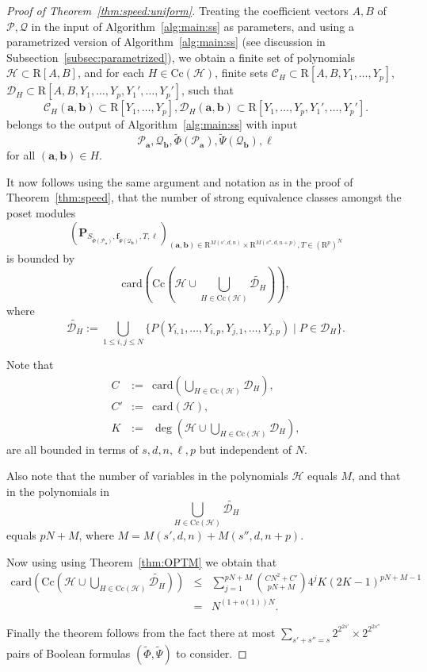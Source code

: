 \documentclass{amsart}[10pts]
\theoremstyle{definition}
\theoremstyle{remark}
\theoremstyle{observation}
\numberwithin{equation}{section}
\newcommand {\R} {\mathrm{R}}
\newcommand{\card}{\mathrm{card}}
\newcommand{\Cc}{\mathrm{Cc}}
\begin{document}
\begin{proof}[Proof of Theorem~\ref{thm:speed:uniform}]
Treating the coefficient vectors $A,B$ of $\mathcal{P},\mathcal{Q}$ in
the input of Algorithm~\ref{alg:main:ss} as parameters, 
and using a parametrized version of  Algorithm~\ref{alg:main:ss} (see discussion in Subsection~\ref{subsec:parametrized}),
we obtain a finite set of polynomials $\mathcal{H} \subset \R[A,B]$, and for each $H \in \Cc(\mathcal{H})$,
finite sets $\mathcal{C}_H \subset \R[A,B,Y_1,\ldots,Y_p]$,
$\mathcal{D}_H \subset \R[A,B,Y_1,\ldots,Y_p,Y_1',\ldots,Y_p']$,
such that
\[
\mathcal{C}_H(\mathbf{a},\mathbf{b}) \subset \R[Y_1,\ldots,Y_p],
\mathcal{D}_H(\mathbf{a},\mathbf{b}) \subset \R[Y_1,\ldots,Y_p,Y_1',\ldots,Y_p'].
\]
belongs to
the output of Algorithm~\ref{alg:main:ss} with input 
\[
\mathcal{P}_{\mathbf{a}},\mathcal{Q}_{\mathbf{b}}, \widetilde{\Phi}(\mathcal{P}_{\mathbf{a}}),\widetilde{\Psi}(\mathcal{Q}_{\mathbf{b}}),
\ell
\]
for all $(\mathbf{a},\mathbf{b}) \in H$.

It now follows using the same argument and notation as in the proof of 
Theorem~\ref{thm:speed}, that the number of strong equivalence classes amongst the poset modules 
\[
\left(\mathbf{P}_{S_{\widetilde{\Phi}(\mathcal{P}_{\mathbf{a}})}, \mathbf{f}_{\widetilde{\Psi}(\mathcal{Q}_{\mathbf{b}})},T,\ell}\right)_{(\mathbf{a},\mathbf{b}) \in 
\R^{M(s',d,n)}\times \R^{M(s'',d,n+p)}, T \in (\R^p)^N
}
\]
is bounded by
\[
\card(\Cc(\mathcal{H} \cup \bigcup_{H \in \Cc(\mathcal{H})} \widetilde{\mathcal{D}_H})),
\]
where
\[
    \widetilde{\mathcal{D}_H} := \bigcup_{1 \leq i,j \leq N} \{P(Y_{i,1},\ldots,Y_{i,p}, Y_{j,1},\ldots,Y_{j,p}) \mid P \in \mathcal{D}_H \}.
    \]

Note that 
\begin{eqnarray*}
 C &:=& \card(\bigcup_{H \in \Cc(\mathcal{H})} \mathcal{D}_H),\\
 C' &:=&  \card(\mathcal{H}), \\
 K &:=& \deg(\mathcal{H} \cup \bigcup_{H \in \Cc(\mathcal{H})} \mathcal{D}_H),
\end{eqnarray*}
are all bounded in terms of $s,d,n,\ell,p$ but independent of $N$.

Also note that the number of variables in the polynomials
$\mathcal{H}$ equals $M$, and 
that in the polynomials in 
\[
\bigcup_{H \in \Cc(\mathcal{H})} \widetilde{\mathcal{D}_H}
\]
equals $p N + M$,
where $M =M(s',d,n) + M(s'',d,n+p)$.

Now using
using Theorem~\ref{thm:OPTM} we obtain that
\begin{eqnarray*}
\card(\Cc(\mathcal{H} \cup \bigcup_{H \in \Cc(\mathcal{H})} \widetilde{\mathcal{D}_H})) &\leq&
\sum_{j=1}^{p N + M} \binom{C N^2 + C'}{p N + M} 4^j K(2K-1)^{p N + M-1} \\
&=& N^{(1 + o(1))N}.
\end{eqnarray*}


Finally the theorem follows from the fact there at most 
$\sum_{s' + s'' =s } 2^{2^{2s'}} \times 2^{2^{2s''}}$ pairs
of Boolean formulas $(\widetilde{\Phi},\widetilde{\Psi})$ to consider.
\end{proof}











 
\end{document}
